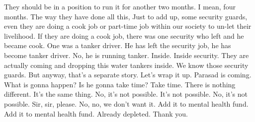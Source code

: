 They should be in a position to run it for another two months.
I mean, four months.
The way they have done all this,
Just to add up, some security guards,
even they are doing a cook job or part-time job
within our society to un-let their livelihood.
If they are doing a cook job,
there was one security who left and he became cook.
One was a tanker driver.
He has left the security job, he has become tanker driver.
No, he is running tanker.
Inside.
Inside security.
They are actually coming and dropping this water tankers inside.
We know those security guards.
But anyway, that's a separate story.
Let's wrap it up.
Parasad is coming.
What is gonna happen?
Is he gonna take time?
Take time.
There is nothing different.
It's the same thing.
No, it's not possible.
It's not possible.
No, it's not possible.
Sir, sir, please.
No, no, we don't want it.
Add it to mental health fund.
Add it to mental health fund.
Already depleted.
Thank you.
